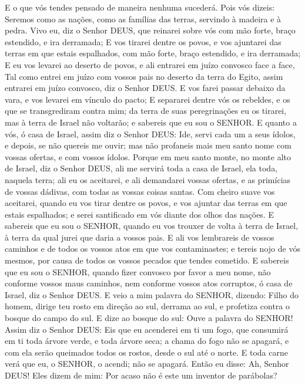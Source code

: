 {E o que vós tendes pensado de maneira nenhuma sucederá. Pois vós dizeis: Seremos como as nações, como as famílias das terras, servindo à madeira e à pedra.
Vivo eu, diz o Senhor DEUS, que reinarei sobre vós com mão forte, braço estendido, e ira derramada;
E vos tirarei dentre os povos, e vos ajuntarei das terras em que estais espalhados, com mão forte, braço estendido, e ira derramada;
E eu vos levarei ao deserto de povos, e ali entrarei em juízo convosco face a face,
Tal como entrei em juízo com vossos pais no deserto da terra do Egito, assim entrarei em juízo convosco, diz o Senhor DEUS.
E vos farei passar debaixo da vara, e vos levarei em vínculo do pacto;
E separarei dentre vós os rebeldes, e os que se transgrediram contra mim; da terra de suas peregrinações eu os tirarei, mas à terra de Israel não voltarão; e sabereis que eu sou o SENHOR.
E quanto a vós, ó casa de Israel, assim diz o Senhor DEUS: Ide, servi cada um a seus ídolos, e depois, se não quereis me ouvir; mas não profaneis mais meu santo nome com vossas ofertas, e com vossos ídolos.
Porque em meu santo monte, no monte alto de Israel, diz o Senhor DEUS, ali me servirá toda a casa de Israel, ela toda, naquela terra; ali eu os aceitarei, e ali demandarei vossas ofertas, e as primícias de vossas dádivas, com todas as vossas coisas santas.
Com cheiro suave vos aceitarei, quando eu vos tirar dentre os povos, e vos ajuntar das terras em que estais espalhados; e serei santificado em vós diante dos olhos das nações.
E sabereis que eu sou o SENHOR, quando eu vos trouxer de volta à terra de Israel, à terra da qual jurei
 que daria a vossos pais.
E ali vos lembrareis de vossos caminhos e de todos os vossos atos em que vos contaminastes; e tereis nojo de vós mesmos, por causa de todos os vossos pecados que tendes cometido.
E sabereis que eu sou o SENHOR, quando fizer convosco por favor a meu nome, não conforme vossos maus caminhos, nem conforme vossos atos corruptos, ó casa de Israel, diz o Senhor DEUS.
E veio a mim palavra do SENHOR, dizendo:
Filho do homem, dirige teu rosto em direção ao sul, derrama
{} ao sul, e profetiza contra o bosque do campo do sul.
E dize ao bosque do sul: Ouve a palavra do SENHOR! Assim diz o Senhor DEUS: Eis que eu acenderei em ti um fogo, que consumirá em ti toda árvore verde, e toda árvore seca; a chama do fogo não se apagará, e com ela serão queimados todos os rostos, desde o sul até o norte.
E toda carne verá
 que eu, o SENHOR, o acendi; não se apagará.
Então eu disse: Ah, Senhor DEUS! Eles dizem de mim: Por acaso não é este um inventor de parábolas?

}
